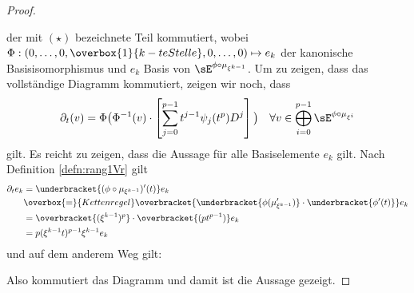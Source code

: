 \begin{proof}
\begin{center}
\end{center}
der mit $(\star)$ bezeichnete Teil kommutiert,
wobei $\Phi:(0,\dots,0,\overbox{1}{k-te Stelle},0,\dots,0)\mapsto e_k$ der
kanonische Basisisomorphismus und $e_k$ Basis von
$\sE^{\phi\circ\mu_{\xi^{k-1}}}$.
Um zu zeigen, dass das vollständige Diagramm kommutiert, zeigen wir noch, dass
\begin{align*}
\partial_t(v) =\Phi\big(\Phi^{-1}(v)
  \cdot\left[\sum_{j=0}^{p-1}t^{j-1}\psi_j(t^p)D^j\right]\big)
& & \forall v\in \bigoplus_{i=0}^{p-1}\sE^{\phi\circ\mu_{\xi^i}} \\
\end{align*}
gilt. Es reicht zu zeigen, dass die Aussage für alle Basiselemente $e_k$ gilt.
Nach Definition \ref{defn:rang1Vr} gilt
\begin{align*}
\partial_t e_k &= \underbracket{(\phi\circ\mu_{\xi^{k-1}})'(t)}e_k
\\&\overbox{=}{Kettenregel}
  \overbracket{\underbracket{\phi(\mu_{\xi^{k-1}}')}
  \cdot\underbracket{\phi'(t)}}e_k
\\&=\overbracket{(\xi^{k-1})^p}\cdot\overbracket{(pt^{p-1})}e_k
\\&=p(\xi^{k-1}t)^{p-1}\xi^{k-1}e_k
\end{align*}
und auf dem anderem Weg gilt:
\begin{center}
\end{center}
Also kommutiert das Diagramm und damit ist die Aussage gezeigt.
\end{proof}
\fi

